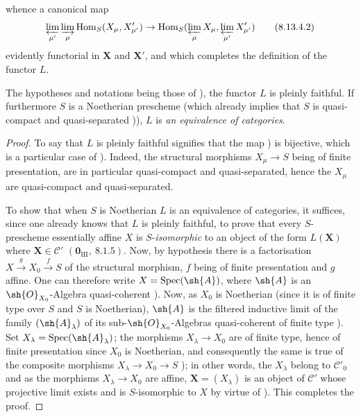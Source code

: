 whence a canonical map
\begin{equation}
\label{IV.8.13.4.2}
\varprojlim_{\mu'}\varinjlim_\mu\operatorname{Hom}_S(X_\mu,X'_{\mu'})\to\operatorname{Hom}_S(\varprojlim_\mu X_\mu,\varprojlim_{\mu'}X'_{\mu'}) \tag{8.13.4.2}
\end{equation}
evidently functorial in $\mathbf{X}$ and $\mathbf{X}'$, and which completes the definition of the functor $L$.

\begin{proposition}[8.13.5]
\label{IV.8.13.5}
The hypotheses and notations being those of ), the functor $L$ is pleinly faithful.
If furthermore $S$ is a Noetherian prescheme (which already implies that $S$ is quasi-compact and quasi-separated )), $L$ is \emph{an equivalence of categories}.
\end{proposition}

\begin{proof}
To say that $L$ is pleinly faithful signifies that the map ) is bijective, which is a particular case of ).
Indeed, the structural morphisms $X_\mu\to S$ being of finite presentation, are in particular quasi-compact and quasi-separated, hence the $X_\mu$ are quasi-compact and quasi-separated.

To show that when $S$ is Noetherian $L$ is an equivalence of categories, it suffices, since one already knows that $L$ is pleinly faithful, to prove that every $S$-prescheme essentially affine $X$ is $S$-\emph{isomorphic} to an object of the form $L(\mathbf{X})$ where $\mathbf{X}\in\mathcal{C}'$ $(\mathbf{0}_{\text{III}},~8.1.5)$.
Now, by hypothesis there is a factorisation $X\xrightarrow{g}X_0\xrightarrow{f}S$ of the structural morphism, $f$ being of finite presentation and $g$ affine.
One can therefore write $X=\operatorname{Spec}(\sh{A})$, where $\sh{A}$ is an $\sh{O}_{X_0}$-Algebra quasi-coherent ).
Now, as $X_0$ is Noetherian (since it is of finite type over $S$ and $S$ is Noetherian), $\sh{A}$ is the filtered inductive limit of the family $(\sh{A}_\lambda)$ of its sub-$\sh{O}_{X_0}$-Algebras quasi-coherent of finite type ).
Set $X_\lambda=\operatorname{Spec}(\sh{A}_\lambda)$; the morphisms $X_\lambda\to X_0$ are of finite type, hence of finite presentation since $X_0$ is Noetherian, and consequently the same is true of the composite morphisms $X_\lambda\to X_0\to S$ ); in other words, the $X_\lambda$ belong to $\mathcal{C}'_0$ and as the morphisms $X_\lambda\to X_0$ are affine, $\mathbf{X}=(X_\lambda)$ is an object of $\mathcal{C}'$ whose projective limit exists and is $S$-isomorphic to $X$ by virtue of ).
This completes the proof.
\end{proof}


